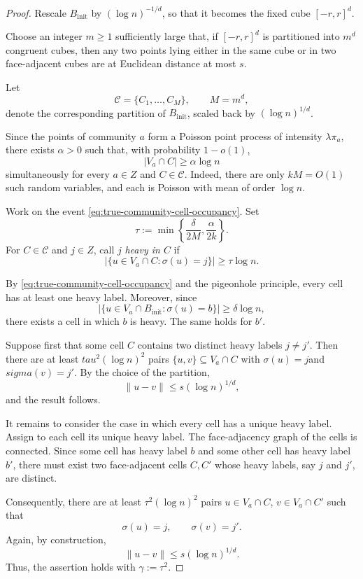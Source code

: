 \documentclass[10pt,a4paper]{amsart}
\begin{document}
\begin{proof}
Rescale $B_{\mathrm{init}}$ by $(\log n)^{-1/d}$, so that it
becomes the fixed cube $[-r,r]^d$.

Choose an integer $m\geq1$ sufficiently large that, if
$[-r,r]^d$ is partitioned into $m^d$ congruent cubes, then any two
points lying either in the same cube or in two face-adjacent cubes
are at Euclidean distance at most $s$.

Let
\[
\mathcal C=\{C_1,\ldots,C_M\},
\qquad M=m^d,
\]
denote the corresponding partition of $B_{\mathrm{init}}$, scaled
back by $(\log n)^{1/d}$.

Since the points of community $a$ form a Poisson point process of
intensity $\lambda\pi_a$, there exists $\alpha>0$ such that, with
probability $1-o(1)$,
\begin{equation}
\label{eq:true-community-cell-occupancy}
|V_a\cap C|
\geq
\alpha\log n
\end{equation}
simultaneously for every $a\in Z$ and $C\in\mathcal C$.
Indeed, there are only $kM=O(1)$ such random variables, and each is
Poisson with mean of order $\log n$.

Work on the event \eqref{eq:true-community-cell-occupancy}. Set
\[
\tau
:=
\min\left\{
\frac{\delta}{2M},
\frac{\alpha}{2k}
\right\}.
\]
For $C\in\mathcal C$ and $j\in Z$, call $j$ \emph{heavy in $C$} if
\[
\left|
\{u\in V_a\cap C:\sigma(u)=j\}
\right|
\geq
\tau\log n.
\]

By \eqref{eq:true-community-cell-occupancy} and the pigeonhole
principle, every cell has at least one heavy label. Moreover, since
\[
\left|
\{u\in V_a\cap B_{\mathrm{init}}:\sigma(u)=b\}
\right|
\geq\delta\log n,
\]
there exists a cell in which $b$ is heavy. The same holds for $b'$.

Suppose first that some cell $C$ contains two distinct heavy labels
$j\neq j'$. Then there are at least $tau^2(\log n)^2$ pairs $\{u,v\}\subseteq V_a\cap C$ with $\sigma(u)=j$and $sigma(v)=j'$.
By the choice of the partition,
\[
\|u-v\|
\leq
s(\log n)^{1/d},
\]
and the result follows.

It remains to consider the case in which every cell has a unique
heavy label. Assign to each cell its unique heavy label. The
face-adjacency graph of the cells is connected. Since some cell has
heavy label $b$ and some other cell has heavy label $b'$, there must
exist two face-adjacent cells $C,C'$ whose heavy labels, say $j$ and
$j'$, are distinct.

Consequently, there are at least $\tau^2(\log n)^2$ pairs
$u\in V_a\cap C$, $v\in V_a\cap C'$ such that
\[
\sigma(u)=j,
\qquad
\sigma(v)=j'.
\]
Again, by construction,
\[
\|u-v\|
\leq
s(\log n)^{1/d}.
\]
Thus, the assertion holds with $\gamma:=\tau^2$.
\end{proof}
\end{document}
